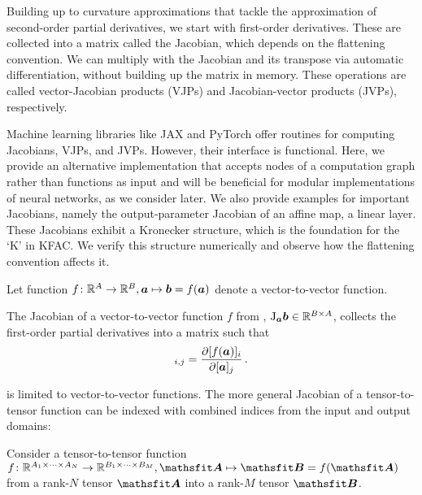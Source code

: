Building up to curvature approximations that tackle the approximation of second-order partial derivatives, we start with first-order derivatives.
These are collected into a matrix called the Jacobian, which depends on the flattening convention.
We can multiply with the Jacobian and its transpose via automatic differentiation, without building up the matrix in memory.
These operations are called vector-Jacobian products (VJPs) and Jacobian-vector products (JVPs), respectively.

Machine learning libraries like JAX and PyTorch offer routines for computing Jacobians, VJPs, and JVPs.
However, their interface is functional.
Here, we provide an alternative implementation that accepts nodes of a computation graph rather than functions as input and will be beneficial for modular implementations of neural networks, as we consider later.
We also provide examples for important Jacobians, namely the output-parameter Jacobian of an affine map, \ie a linear layer.
These Jacobians exhibit a Kronecker structure, which is the foundation for the `K' in KFAC.
We verify this structure numerically and observe how the flattening convention affects it.

\begin{setup}\label{setup:vector_to_vector_function}
  Let function $f\colon {\mathbb{R}}^A \to {\mathbb{R}}^B, {\bm{a}} \mapsto {\bm{b}} = f({\bm{a}})$ denote a vector-to-vector function.
\end{setup}

\begin{definition}\label{def:vector_jacobian}
  The Jacobian of a vector-to-vector function $f$ from , $\mathrm{J}_{{\bm{a}}}{\bm{b}} \in {\mathbb{R}}^{B \times A}$, collects the first-order partial derivatives into a matrix such that
  \begin{align*}
    [\jac_{\va} \vb]_{i,j} = \frac{\partial [f(\va)]_i}{\partial [\va]_j}\,.
  \end{align*}
\end{definition}
 is limited to vector-to-vector functions.
The more general Jacobian of a tensor-to-tensor function can be indexed with combined indices from the input and output domains:

\begin{setup}\label{setup:jacobians}
  Consider a tensor-to-tensor function $f\colon \sR^{A_1 \times \dots \times A_N} \to \sR^{B_1 \times \dots \times B_M}, \tA \mapsto \tB = f(\tA)$ from a rank-$N$ tensor $\tA$ into a rank-$M$ tensor $\tB$.
\end{setup}

